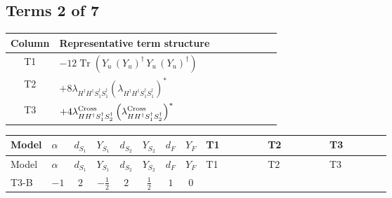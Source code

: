\documentclass[8pt]{article}
\begin{document}
\begin{landscape}
\subsection*{Terms 2 of 7}
\begin{center}
\begin{tabular}{@{}c >{\raggedright\arraybackslash}p{0.82\linewidth}@{}}
\toprule
Column & Representative term structure \\
\midrule
T1 & \(\displaystyle -12 \operatorname{Tr}\!\left({Y_u}\,\left({Y_u}\right)^{\dagger}\,{Y_u}\,\left({Y_u}\right)^{\dagger}\right)\) \\
\midrule
T2 & \(\displaystyle +8 {\lambda_{H^\dagger H^\dagger S_1^\dagger S_1^\dagger}} \left({\lambda_{H^\dagger H^\dagger S_1^\dagger S_1^\dagger}}\right)^{*}\) \\
\midrule
T3 & \(\displaystyle +4 {\lambda_{H H^\dagger S_1^\dagger S_2^\dagger}^{\rm Cross}} \left({\lambda_{H H^\dagger S_1^\dagger S_2^\dagger}^{\rm Cross}}\right)^{*}\) \\
\midrule
\bottomrule
\end{tabular}
\end{center}
\smallskip
\tiny
\begin{longtable}{@{}llcccccc >{\raggedright\arraybackslash}p{0.21\linewidth} >{\raggedright\arraybackslash}p{0.21\linewidth} >{\raggedright\arraybackslash}p{0.21\linewidth}@{}}
\toprule
Model & $\alpha$ & $d_{S_1}$ & $Y_{S_1}$ & $d_{S_2}$ & $Y_{S_2}$ & $d_F$ & $Y_F$ & T1 & T2 & T3 \\
\midrule
\endfirsthead
\toprule
Model & $\alpha$ & $d_{S_1}$ & $Y_{S_1}$ & $d_{S_2}$ & $Y_{S_2}$ & $d_F$ & $Y_F$ & T1 & T2 & T3 \\
\midrule
\endhead
T3-B & $-1$ & $2$ & $-\frac{1}{2}$ & $2$ & $\frac{1}{2}$ & $1$ & $0$ & \scriptsize\adjustbox{max width=\linewidth}{$\begin{gathered} -12 \operatorname{Tr}\!\left({Y_u}\,\left({Y_u}\right)^{\dagger}\,{Y_u}\,\left({Y_u}\right)^{\dagger}\right)\end{gathered}$} & \scriptsize\adjustbox{max width=\linewidth}{$\begin{gathered} +8 {\lambda_{H^\dagger H^\dagger S_1^\dagger S_1^\dagger}} \left({\lambda_{H^\dagger H^\dagger S_1^\dagger S_1^\dagger}}\right)^{*}\end{gathered}$} & \scriptsize\adjustbox{max width=\linewidth}{$\begin{gathered} +4 {\lambda_{H H^\dagger S_1^\dagger S_2^\dagger}^{\rm Cross}} \left({\lambda_{H H^\dagger S_1^\dagger S_2^\dagger}^{\rm Cross}}\right)^{*}\end{gathered}$} \\

\end{longtable}
\end{landscape}
\end{document}
